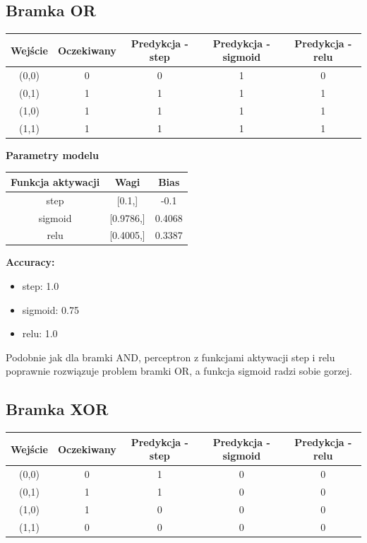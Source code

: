 \documentclass[a4paper,12pt]{article}
\begin{document}
\subsection{Bramka OR}

\begin{table}[H]
\centering
\begin{tabular}{c|c|c|c|c}
Wejście & Oczekiwany & Predykcja - step & Predykcja - sigmoid & Predykcja - relu\\
\hline
(0,0) & 0 & 0 & 1 & 0\\
(0,1) & 1 & 1 & 1 & 1\\
(1,0) & 1 & 1 & 1 & 1\\
(1,1) & 1 & 1 & 1 & 1\\
\end{tabular}
\end{table}

\textbf{Parametry modelu}

\begin{table}[H]
\centering
\begin{tabular}{c|c|c}
Funkcja aktywacji & Wagi & Bias\\
\hline
step & [0.1,\;0.1] & -0.1\\
sigmoid & [0.9786,\;0.9888] & 0.4068\\
relu & [0.4005,\;0.4258] & 0.3387\\
\end{tabular}
\end{table}
\break

\textbf{Accuracy:}
\begin{itemize}
\item step: 1.0
\item sigmoid: 0.75
\item relu: 1.0
\end{itemize}

Podobnie jak dla bramki AND, perceptron z funkcjami aktywacji step i relu poprawnie rozwiązuje problem bramki OR, a funkcja sigmoid radzi sobie gorzej.

\subsection{Bramka XOR}

\begin{table}[H]
\centering
\begin{tabular}{c|c|c|c|c}
Wejście & Oczekiwany & Predykcja - step & Predykcja - sigmoid & Predykcja - relu\\
\hline
(0,0) & 0 & 1 & 0 & 0\\
(0,1) & 1 & 1 & 0 & 0\\
(1,0) & 1 & 0 & 0 & 0\\
(1,1) & 0 & 0 & 0 & 0\\
\end{tabular}
\end{table}
\end{document}

